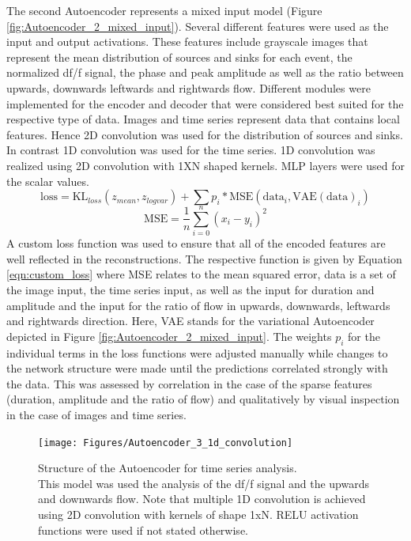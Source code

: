 The second Autoencoder represents a mixed input model (Figure \ref{fig:Autoencoder_2_mixed_input}). Several different features were used as the input and output activations. These features include grayscale images that represent the mean distribution of sources and sinks for each event, the normalized df/f signal, the phase and peak amplitude as well as the ratio between upwards, downwards leftwards and rightwards flow. Different modules were implemented for the encoder and decoder that were considered best suited for the respective type of data. Images and time series represent data that contains local features. Hence 2D convolution was used for the distribution of sources and sinks. In contrast 1D convolution was used for the time series. 1D convolution was realized using 2D convolution with 1XN shaped kernels. MLP layers were used for the scalar values. \\
\begin{equation}
\text{loss} = \text{KL}_{loss}(z_{mean},z_{logvar}) + \sum p_i * \text{MSE}(\text{data}_i, \text{VAE}(\text{data})_i)
\label{eqn:custom_loss}
\end{equation}
\begin{equation}
\text{MSE}=\frac{1}{n} \sum_{i=0}^n (x_{i}-y_{i})^2
\label{eqn:mse}
\end{equation}
A custom loss function was used to ensure that all of the encoded features are well reflected in the reconstructions. The respective function is given by Equation \ref{eqn:custom_loss} where MSE relates to the mean squared error, data is a set of the image input, the time series input, as well as the input for duration and amplitude and the input for the ratio of flow in upwards, downwards, leftwards and rightwards direction. Here, VAE stands for the variational Autoencoder depicted in Figure \ref{fig:Autoencoder_2_mixed_input}. The weights $p_i$ for the individual terms in the loss functions were adjusted manually while changes to the network structure were made until the predictions correlated strongly with the data. This was assessed by correlation in the case of the sparse features (duration, amplitude and the ratio of flow) and qualitatively by visual inspection in the case of images and time series.\\
\begin{figure}[!htb]
\centering
\texttt{[image: Figures/Autoencoder\_3\_1d\_convolution]}
\decoRule
\caption[Structure of the Autoencoder for time series analysis]{Structure of the Autoencoder for time series analysis.\\ This model was used the analysis of the df/f signal and the upwards and downwards flow. Note that multiple 1D convolution is achieved using 2D convolution with kernels of shape 1xN. RELU activation functions were used if not stated otherwise.}
\label{fig:Autoencoder_3_1d_convolution}
\end{figure}

